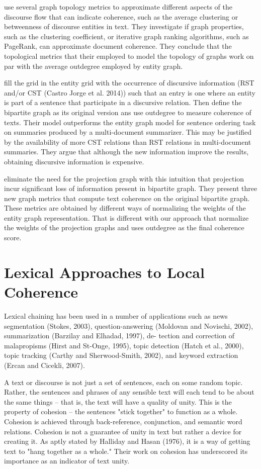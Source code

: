  
\cite{petersen15} use several graph topology metrics to approximate different aspects of the discourse flow that can indicate coherence, such as the average clustering or betweenness of discourse entities in text. 
They investigate if graph properties, such as the clustering coefficient, or iterative graph ranking algorithms, such as PageRank,  can approximate document coherence. 
They conclude that the topological metrics that their employed to model the topology of graphs work on par with the average outdegree employed by  entity graph. 


\cite{dias15}  fill the grid in the entity grid with the occurrence of discursive information
(RST and/or CST \cite{?}(Castro Jorge et al. 2014)) such that an entry is one where an entity is part of a sentence that participate in a discursive relation.
Then define the bipartite graph as its original version ans use outdegree to measure coherence of texts. 
Their model outperforms the entity graph model for sentence ordering task on summaries produced by a multi-document summarizer. 
This may be justified by the availability of more CST relations than RST relations in multi-document summaries.
They argue that although the new information improve the results, obtaining discursive information is expensive. 


\cite{lioma16} eliminate the need for the projection graph with this intuition that projection incur significant loss of information present in bipartite graph.  
They present three new graph metrics that compute text coherence on the original bipartite graph. 
These metrics are obtained by different ways of normalizing the weights of the entity graph representation. 
That is different with our approach that normalize the weights of the projection graphs and uses outdegree as the final coherence score. 


\section{Lexical Approaches to Local Coherence}

Lexical chaining has been used in a number of applications such as news segmentation (Stokes, 2003), question-answering (Moldovan and Novischi, 2002), summarization (Barzilay and Elhadad, 1997), de- tection and correction of malapropisms (Hirst and St-Onge, 1995), topic detection (Hatch et al., 2000), topic tracking (Carthy and Sherwood-Smith, 2002), and keyword extraction (Ercan and Cicekli, 2007).

A text or discourse is not just a set of sentences, each on some random topic. 
Rather, the sentences and phrases of any sensible text will each tend to be about the same things -- that is, the text will have a quality of unity. 
This is the property of cohesion -- the sentences "stick together" to function as a whole. 
Cohesion is achieved through back-reference, conjunction, and semantic word relations. 
Cohesion is not a guarantee of unity in text but rather a device for creating it. 
As aptly stated by Halliday and Hasan (1976), it is a way of getting text to "hang together as a whole." Their work on cohesion has underscored its importance as an indicator of text unity.

